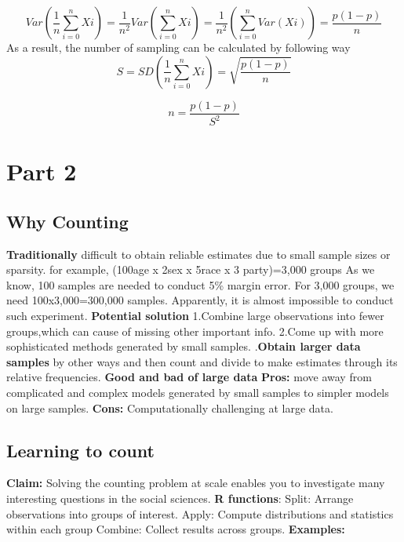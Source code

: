 \begin{equation} Var(\dfrac{1}{n} \sum_{i=0}^n X{i}) =\dfrac{1}{n^2}Var(\sum_{i=0}^n X{i}) = \dfrac{1}{n^2}(\sum_{i=0}^n Var (X{i}))=\dfrac{p(1-p)}{n}
\end{equation}
\newline As a result, the number of sampling can be calculated by following way
\begin{equation}
S=SD(\dfrac{1}{n} \sum_{i=0}^n X{i})=\sqrt{\dfrac{p(1-p)}{n}}
\end{equation}

\begin{equation}
n=\dfrac{p(1-p)}{S^2}
\end{equation}

\section{Part 2}
\subsection{Why Counting}

\textbf{Traditionally} difficult to obtain reliable estimates due to small sample sizes or sparsity.
\newline for example, (100age x 2sex x 5race x 3 party)=3,000 groups
As we know, 100 samples are needed to conduct 5\% margin error. For 3,000 groups, we need 100x3,000=300,000 samples. Apparently, it is almost impossible to conduct such experiment.
\newline\textbf{Potential solution}
\newline1.Combine large observations into fewer groups,which can cause of missing other important info. 
\newline2.Come up with more sophisticated methods generated by small samples.
.\textbf{Obtain larger data samples } by other ways and then count and divide to make estimates through its relative frequencies.
\newline\textbf{Good and bad of large data }
\newline\textbf{Pros:} move away from complicated and complex models generated by small samples to simpler models on large samples. 
\newline\textbf{Cons:} Computationally challenging at large data.
\subsection{Learning to count}
\textbf{Claim:} Solving the counting problem at scale enables you to investigate many interesting questions in the social sciences.
\newline\textbf{R functions}:
\newline Split: Arrange observations into groups of interest.
\newline Apply: Compute distributions and statistics within each group
\newline Combine: Collect results across groups.
\newline\textbf{Examples:}

